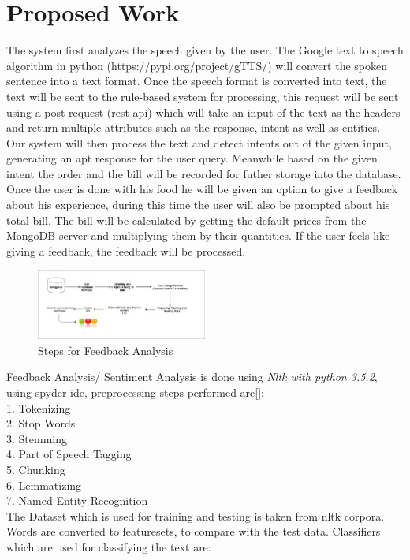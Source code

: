 \documentclass[conference]{IEEEtran}
\begin{document}
\section{Proposed Work}
The system first analyzes the speech given by the user. The Google text to speech algorithm in python (https://pypi.org/project/gTTS/) will convert the spoken sentence into a text format. Once the speech format is converted into text, the text will be sent to the rule-based system for processing, this request will be sent using a post request (rest api) which will take an input of the text as the headers and return multiple attributes such as the response, intent as well as entities. \\
Our system will then process the text and detect intents out of the given input, generating an apt response for the user query. Meanwhile based on the given intent the order and the bill will be recorded for futher storage into the database. Once the user is done with his food he will be given an option to give a feedback about his experience, during this time the user will also be prompted about his total bill. The bill will be calculated by getting the default prices from the MongoDB server and multiplying them by their quantities. If the user feels like giving a feedback, the feedback will be processed. 
\begin{figure}[h!]
	\centering
	\includegraphics[width=0.5\textwidth]{SA.png}
	\caption{Steps for Feedback Analysis}
\end{figure}
Feedback Analysis/ Sentiment Analysis is done using \textit{Nltk with python 3.5.2}, using spyder ide, preprocessing steps performed are[\cite{b7}]:\\
	1. Tokenizing\\
	2. Stop Words\\
	3. Stemming\\
	4. Part of Speech Tagging\\
	5. Chunking\\
	6. Lemmatizing\\
	7. Named Entity Recognition\\
The Dataset which is used for training and testing is taken from nltk corpora. Words are converted to featuresets, to compare with the test data. Classifiers which are used for classifying the text are:\\
\end{document}

